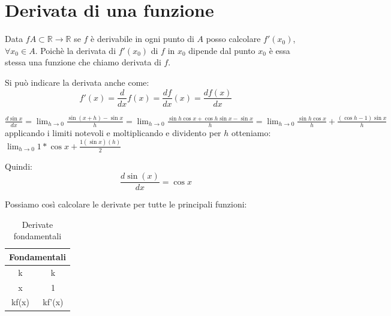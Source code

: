 \section{Derivata di una funzione}
Data $f A\subset \mathbb{R}\to\mathbb{R}$ se $f$ è derivabile in ogni punto di $A$ posso calcolare $f'(x_0)$, $\forall x_0\in A$. Poichè la derivata di $f'(x_0)$ di $f$ in $x_0$ dipende dal punto $x_0$ è essa stessa una funzione che chiamo derivata di $f$.
\begin{notation}
    Si può indicare la derivata anche come:
    \begin{equation*}
        f'(x)=\frac{d}{dx}f(x)=\frac{df}{dx}(x)=\frac{df(x)}{dx}
    \end{equation*}
    
    \begin{example}
        $\frac{d\sin{x}}{dx}=\lim_{h\to0}\frac{\sin{(x+h)}-\sin{x}}{h}=\lim_{h\to0}\frac{\sin{h}\cos{x}+\cos{h}\sin{x}-\sin{x}}{h}=\lim_{h\to0}\frac{\sin{h}\cos{x}}{h}+\frac{(\cos{h-1})\sin{x}}{h}$ applicando i limiti notevoli e moltiplicando e dividento per $h$ otteniamo:
        $\lim_{h\to0}1*\cos{x}+\frac{1(\sin{x})(h)}{2}$
        
        Quindi:
        \begin{equation*}
            \frac{d\sin(x)}{dx}=\cos{x}
        \end{equation*}
    \end{example}
\end{notation}

Possiamo così calcolare le derivate per tutte le principali funzioni:
\begin{table}[ht]
    \centering
    \begin{tabular}{|c|c|}
        \hline\multicolumn{2}{|c|}{\textbf{Fondamentali}}\\\hline\hline
        k &k\\\hline
        x&1\\\hline
        kf(x)&kf'(x)\\\hline
    \end{tabular}
    \caption{Derivate fondamentali}
    \label{tab:deriv_fondam}
\end{table}

